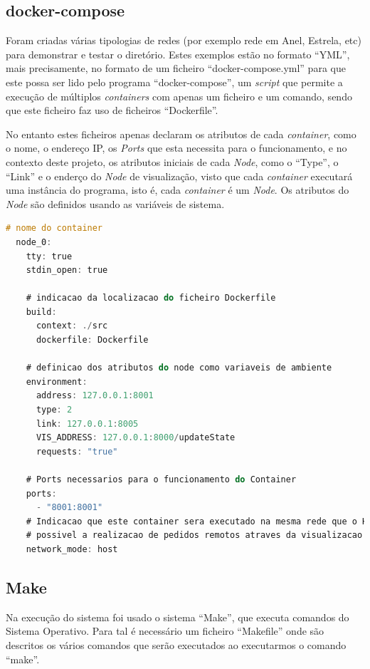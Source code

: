 \subsection*{docker-compose}

Foram criadas várias tipologias de redes (por exemplo rede em Anel, Estrela, etc) para demonstrar e testar o diretório.
Estes exemplos estão no formato ``YML'', mais precisamente, no formato de um ficheiro ``docker-compose.yml'' para que este possa ser lido pelo programa ``docker-compose'', um \emph{script} que permite a execução de múltiplos \emph{containers} com apenas um ficheiro e um comando, sendo que este ficheiro faz uso de ficheiros ``Dockerfile''.

No entanto estes ficheiros apenas declaram os atributos de cada \emph{container}, como o nome, o endereço \acs{IP}, os \emph{Ports} que esta necessita para o funcionamento, e no contexto deste projeto, os atributos iniciais de cada \emph{Node}, como o ``Type'', o 
``Link'' e o enderço do \emph{Node} de visualização, visto que cada \emph{container} executará uma instância do programa, isto é, cada \emph{container} é um \emph{Node}. Os atributos do \emph{Node} são definidos usando as variáveis de sistema.


\begin{lstlisting}[caption={Ficheiro docker-compose.yml},language=C]
  # nome do container
  node_0:
    tty: true
    stdin_open: true

    # indicacao da localizacao do ficheiro Dockerfile
    build:
      context: ./src
      dockerfile: Dockerfile

    # definicao dos atributos do node como variaveis de ambiente
    environment:
      address: 127.0.0.1:8001
      type: 2 
      link: 127.0.0.1:8005
      VIS_ADDRESS: 127.0.0.1:8000/updateState
      requests: "true"

    # Ports necessarios para o funcionamento do Container
    ports:
      - "8001:8001"
    # Indicacao que este container sera executado na mesma rede que o Host, isto para que seja
    # possivel a realizacao de pedidos remotos atraves da visualizacao
    network_mode: host
\end{lstlisting}


\subsection*{Make}

Na execução do sistema foi usado o sistema ``Make'', que executa comandos do Sistema Operativo. Para tal é necessário um ficheiro ``Makefile'' onde são descritos os vários comandos que serão executados ao executarmos o comando ``make''.

